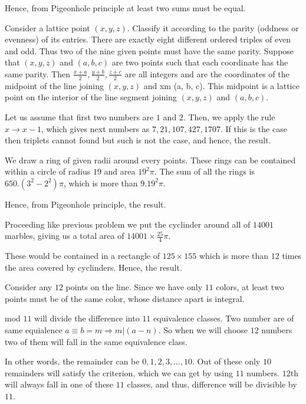   Hence, from Pigeonhole principle at least two sums must be equal.
\item Consider a lattice point $(x, y, z)$.  Classify it according to the parity (oddness or evenness) of
  its entries. There are exactly eight different ordered triples of even and odd.  Thus two of the nine
  given points must have the same parity. Suppose that $(x, y, z)$ and $(a, b, c)$ are two points such that
  each coordinate has the same parity.  Then $\frac{x + a}{2}, \frac{y + b}{2}, \frac{z + c}{2}$ are all
  integers and are the coordinates of the midpoint of the line joining $(x, y, z)$ and xm
  (a, b, c). This midpoint is a lattice point on the interior of the line segment joining $(x, y, z)$ and
  $(a, b, c)$.
\item Let us assume that first two numbers are $1$ and $2$. Then, we apply the rule $x\rightarrow x - 1$,
  which gives next numbers as $7, 21, 107, 427, 1707$. If this is the case then triplets cannot found but
  such is not the case, and hence, the result.
\item We draw a ring of given radii around every points. These rings can be contained within a circle of
  radius $19$ and area $19^2\pi$. The sum of all the rings is $650.(3^2 - 2^2)\pi$, which is more than
  $9.19^2\pi$.

  Hence, from Pigeonhole principle, the result.
\item Proceeding like previous problem we put the cyclinder around all of $14001$ marbles, giving us a total
  area of $14001\times\frac{25}{4}\pi$.

  These would be contained in a rectangle of $125\times155$ which is more than $12$ times the area covered
  by cyclinders. Hence, the result.
\item Consider any $12$ points on the line. Since we have only $11$ colors, at least two points must be of
  the same color, whose distance apart is integral.
\item mod $11$ will divide the difference into $11$ equivalence classes. Two number are of same equialence
  $a\equiv b = m\Rightarrow m|(a - n)$. So when we will choose $12$ numbers two of them will fall in the
  same equivalence class.

  In other words, the remainder can be $0, 1, 2, 3, \ldots, 10$. Out of these only
  $10$ remainders will satisfy the criterion, which we can get by using $11$ numbers. $12$th will always
  fall in one of these $11$ classes, and thus, difference will be divisible by $11$.
\stopitemize
